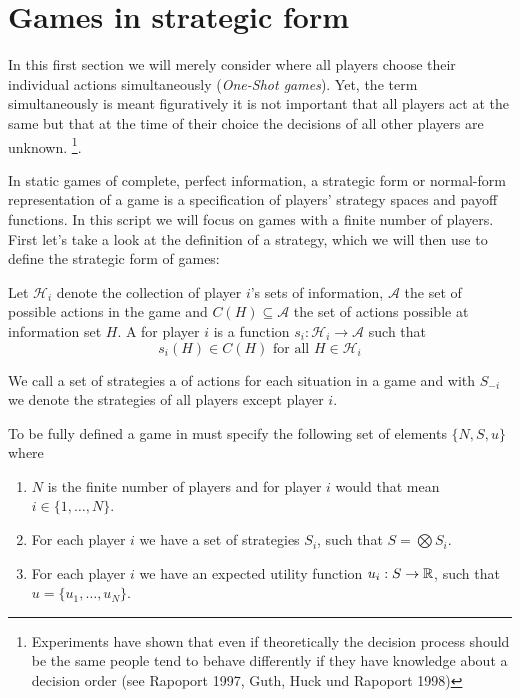 
\section{Games in strategic form}

In this first section we will merely consider  where all players choose their individual actions simultaneously (\textit{One-Shot games}). Yet, the term simultaneously is meant figuratively it is not important that all players act at the same but that at the time of their choice the decisions of all other players are unknown. \footnote{Experiments have shown that even if theoretically the decision process should be the same people tend to behave differently if they have knowledge about a decision order  (see Rapoport 1997, Guth, Huck und Rapoport 1998)}.

In static games of complete, perfect information, a strategic form or normal-form representation of a game is a specification of players' strategy spaces and payoff functions. In this script we will focus on games with a finite number of players. \\

First let's take a look at the definition of a strategy, which we will then use to define the strategic form of games: 

\begin{definition}[Strategy]
	Let $\mathcal{H}_{i}$ denote the collection of player $i$'s sets of information, $\mathcal{A}$ the set of possible actions in the game and $C(H) \subseteq \mathcal{A}$ the set of actions possible at information set $H$. A  for player $i$ is a function $s_{i} \colon \mathcal{H}_{i} \rightarrow \mathcal{A}$ such that
	\[ s_{i}(H) \in C(H) \text{ for all } H \in \mathcal{H}_{i} \]
\end{definition}

We call a set of strategies a  of actions for each situation in a game and with $S_{-i}$ we denote the strategies of all players except player $i$.\\

\begin{definition}
To be fully defined a game in  must specify the following set of elements $\{ N, S, u \}$ where
	\begin{enumerate}
		\item $N$ is the finite number of players and for player $i$ would that mean $i \in \{ 1, \dotsc, N \}$.
		\item For each player $i$ we have a set of strategies $S_{i}$, such that $S = \bigotimes S_{i}$.
		\item For each player $i$ we have an expected utility function $u_{i} : S \rightarrow \mathbb{R}$, such that $u = \{ u_{1}, \dotsc, u_{N} \}$.
	\end{enumerate}
\end{definition}



